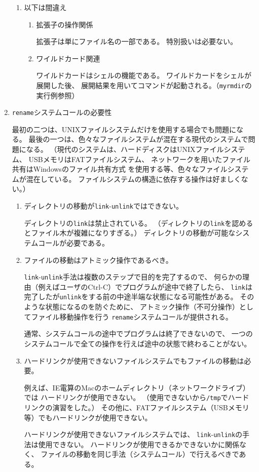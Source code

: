 \documentclass[a4j,dvipdfmx]{jarticle}
\begin{document}
\begin{enumerate}
\begin{enumerate}
\item 以下は間違え

\begin{enumerate}
\item 拡張子の操作関係

拡張子は単にファイル名の一部である。
特別扱いは必要ない。

\item ワイルドカード関連

ワイルドカードはシェルの機能である。
ワイルドカードをシェルが展開した後、
展開結果を用いてコマンドが起動される。（{\tt myrmdir}の実行例参照）

\end{enumerate}
\end{enumerate}

\item {\tt rename}システムコールの必要性

最初の二つは、UNIXファイルシステムだけを使用する場合でも問題になる。
最後の一つは、色々なファイルシステムが混在する現代のシステムで問題になる。
（現代のシステムは、ハードディスクはUNIXファイルシステム、
USBメモリはFATファイルシステム、
ネットワークを用いたファイル共有はWindowsのファイル共有方式
を使用する等、色々なファイルシステムが混在している。
ファイルシステムの構造に依存する操作は好ましくない。）

\begin{enumerate}
\item ディレクトリの移動が{\tt link}-{\tt unlink}ではできない。

ディレクトリの{\tt link}は禁止されている。
（ディレクトリの{\tt link}を認めるとファイル木が複雑になりすぎる。）
ディレクトリの移動が可能なシステムコールが必要である。

\item ファイルの移動はアトミック操作であるべき。

{\tt link}-{\tt unlink}手法は複数のステップで目的を完了するので、
何らかの理由（例えばユーザのCtrl-C）でプログラムが途中で終了したら、
{\tt link}は完了したが{\tt unlink}をする前の中途半端な状態になる可能性がある。
そのような状態になるのを防ぐために、
アトミック操作（不可分操作）としてファイル移動操作を行う
{\tt rename}システムコールが提供される。

通常、システムコールの途中でプログラムは終了できないので、
一つのシステムコールで全ての操作を行えば途中の状態で終わることがない。

\item ハードリンクが使用できないファイルシステムでもファイルの移動は必要。

例えば、IE電算のMacのホームディレクトリ（ネットワークドライブ）では
ハードリンクが使用できない。
（使用できないから{\tt /tmp}でハードリンクの演習をした。）
その他に、FATファイルシステム（USBメモリ等）でもハードリンクが使用できない。

ハードリンクが使用できないファイルシステムでは、
{\tt link}-{\tt unlink}の手法は使用できない。
ハードリンクが使用できるかできないかに関係なく、
ファイルの移動を同じ手法（システムコール）で行えるべきである。

\end{enumerate}
\end{enumerate}
\end{document}
